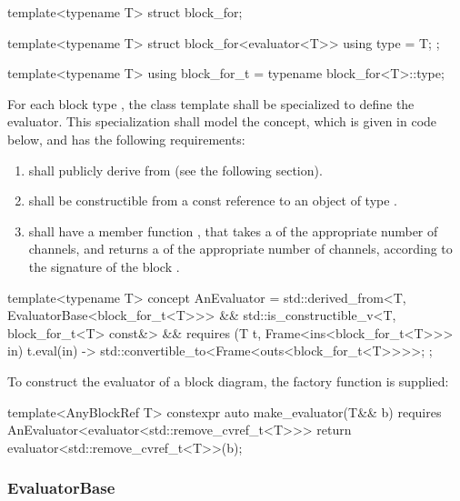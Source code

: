 \begin{cppcodenl}
  template<typename T>
  struct block_for;

  template<typename T>
  struct block_for<evaluator<T>> {
    using type = T;
  };

  template<typename T>
  using block_for_t = typename block_for<T>::type;
\end{cppcodenl}

For each block type , the class template  shall be specialized to define the evaluator. This
specialization shall model the  concept, which is given in code below, and has the
following requirements:

\begin{enumerate}
  \item \label{item:derives}  shall publicly derive from  (see the following
        section).
  \item {} shall be constructible from a const reference to an object of type .
  \item {} shall have a member function , that takes a  of the appropriate number of channels,
        and returns a  of the appropriate number of channels, according to the signature of the
        block .
\end{enumerate}

\begin{cppcodenl}
  template<typename T>
  concept AnEvaluator = 
    std::derived_from<T, EvaluatorBase<block_for_t<T>>>
    && std::is_constructible_v<T, block_for_t<T> const&>
    && requires (T t, Frame<ins<block_for_t<T>>> in) {
      { t.eval(in) } -> std::convertible_to<Frame<outs<block_for_t<T>>>>;
    };
\end{cppcodenl}

To construct the evaluator of a block diagram, the factory function  is supplied:

\begin{cppcodenl}
  template<AnyBlockRef T>
  constexpr auto make_evaluator(T&& b)
  requires AnEvaluator<evaluator<std::remove_cvref_t<T>>>
  {
    return evaluator<std::remove_cvref_t<T>>(b);
  }
\end{cppcodenl}

\subsubsection{EvaluatorBase}

